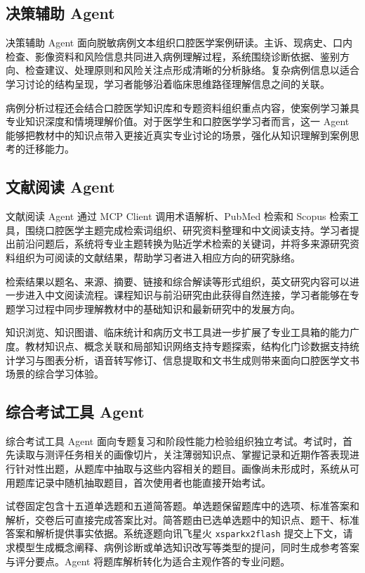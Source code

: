 \subsection{决策辅助 Agent}

决策辅助 Agent 面向脱敏病例文本组织口腔医学案例研读。主诉、现病史、口内检查、影像资料和风险信息共同进入病例理解过程，系统围绕诊断依据、鉴别方向、检查建议、处理原则和风险关注点形成清晰的分析脉络。复杂病例信息以适合学习讨论的结构呈现，学习者能够沿着临床思维路径理解信息之间的关联。

病例分析过程还会结合口腔医学知识库和专题资料组织重点内容，使案例学习兼具专业知识深度和情境理解价值。对于医学生和口腔医学学习者而言，这一 Agent 能够把教材中的知识点带入更接近真实专业讨论的场景，强化从知识理解到案例思考的迁移能力。

\subsection{文献阅读 Agent}

文献阅读 Agent 通过 MCP Client 调用术语解析、PubMed 检索和 Scopus 检索工具，围绕口腔医学主题完成检索词组织、研究资料整理和中文阅读支持。学习者提出前沿问题后，系统将专业主题转换为贴近学术检索的关键词，并将多来源研究资料组织为可阅读的文献结果，帮助学习者进入相应方向的研究脉络。

检索结果以题名、来源、摘要、链接和综合解读等形式组织，英文研究内容可以进一步进入中文阅读流程。课程知识与前沿研究由此获得自然连接，学习者能够在专题学习过程中同步理解教材中的基础知识和最新研究中的发展方向。

知识浏览、知识图谱、临床统计和病历文书工具进一步扩展了专业工具箱的能力广度。教材知识点、概念关联和局部知识网络支持专题探索，结构化门诊数据支持统计学习与图表分析，语音转写修订、信息提取和文书生成则带来面向口腔医学文书场景的综合学习体验。

\subsection{综合考试工具 Agent}
\label{sec:exam-tool-agent}

综合考试工具 Agent 面向专题复习和阶段性能力检验组织独立考试。考试时，首先读取与测评任务相关的画像切片，关注薄弱知识点、掌握记录和近期作答表现进行针对性出题，从题库中抽取与这些内容相关的题目。画像尚未形成时，系统从可用题库记录中随机抽取题目，首次使用者也能直接开始考试。

试卷固定包含十五道单选题和五道简答题。单选题保留题库中的选项、标准答案和解析，交卷后可直接完成答案比对。简答题由已选单选题中的知识点、题干、标准答案和解析提供事实依据。系统逐题向讯飞星火 \texttt{xsparkx2flash} 提交上下文，请求模型生成概念阐释、病例诊断或单选知识改写等类型的提问，同时生成参考答案与评分要点。Agent 将题库解析转化为适合主观作答的专业问题。

